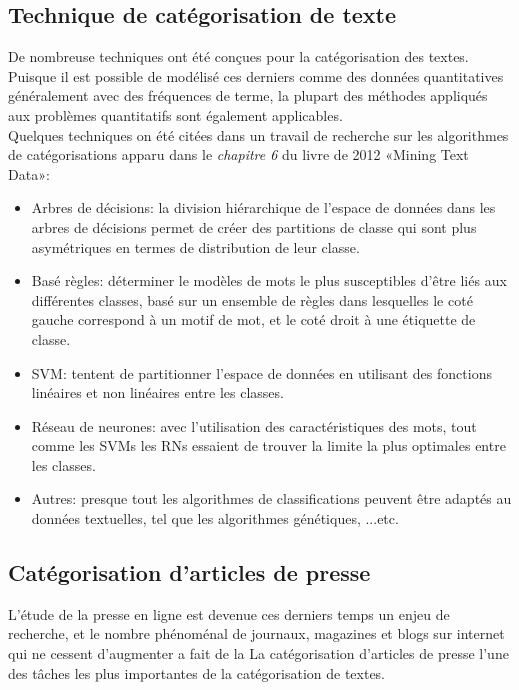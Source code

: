     \subsection{Technique de catégorisation de texte}
    De nombreuse techniques ont été conçues pour la catégorisation des textes. Puisque il est possible de modélisé ces derniers comme des données quantitatives généralement avec des fréquences de terme, la plupart des méthodes appliqués aux problèmes quantitatifs sont également applicables.\\    
    Quelques techniques on été citées dans un travail de recherche sur les algorithmes de catégorisations apparu dans le \emph{chapitre 6} du livre de 2012 «Mining Text Data»\cite{stca}:

    \begin{itemize}
        \item Arbres de décisions: la division hiérarchique de l'espace de données dans les arbres de décisions permet de créer des partitions de classe qui sont plus asymétriques en termes de distribution de leur classe.

        \item Basé règles: déterminer le modèles de mots le plus susceptibles d'être liés aux différentes classes, basé sur un ensemble de règles dans lesquelles le coté gauche correspond à un motif de mot, et le coté droit à une étiquette de classe.

        \item SVM: tentent de partitionner l'espace de données en utilisant des fonctions linéaires et non linéaires entre les classes.

        \item Réseau de neurones: avec l'utilisation des caractéristiques des mots, tout comme les SVMs les RNs essaient de trouver la limite la plus optimales entre les classes.

        \item Autres: presque tout les algorithmes de classifications peuvent être adaptés au données textuelles, tel que les algorithmes génétiques, ...etc.
    \end{itemize}


    \subsection{Catégorisation d'articles de presse}
     L’étude de la presse en ligne est devenue ces derniers temps un enjeu de recherche, et le nombre phénoménal de journaux, magazines et blogs sur internet qui ne cessent d'augmenter a fait de la La catégorisation d'articles de presse l'une des tâches les plus importantes de la catégorisation de textes.

